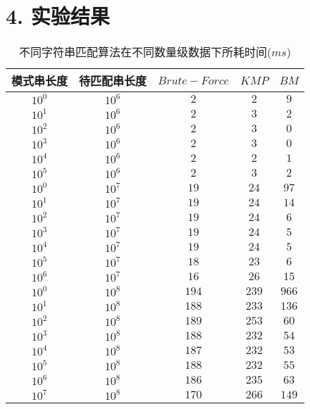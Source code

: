 \documentclass{article}
\begin{document}
  \section*{4. 实验结果}
  \begin{table}[h!]
  	\begin{center}
  		\caption{不同字符串匹配算法在不同数量级数据下所耗时间($ms$)}
  		\begin{tabular}{c|c|c|c|c}
  			\toprule
  			\textbf{模式串长度} & \textbf{待匹配串长度} & \textbf{$Brute-Force$} & \textbf{$KMP$} & \textbf{$BM$} \\
  			\midrule
  			$10^0$ & $10^6$ & $2$ & $2$ & $9$ \\
  			$10^1$ & $10^6$ & $2$ & $3$ & $2$ \\
  			$10^2$ & $10^6$ & $2$ & $3$ & $0$ \\
  			$10^3$ & $10^6$ & $2$ & $3$ & $0$ \\
  			$10^4$ & $10^6$ & $2$ & $2$ & $1$ \\
  			$10^5$ & $10^6$ & $2$ & $3$ & $2$ \\
  			\midrule
  			$10^0$ & $10^7$ & $19$ & $24$ & $97$ \\
  			$10^1$ & $10^7$ & $19$ & $24$ & $14$ \\
  			$10^2$ & $10^7$ & $19$ & $24$ & $6$ \\
  			$10^3$ & $10^7$ & $19$ & $24$ & $5$ \\
  			$10^4$ & $10^7$ & $19$ & $24$ & $5$ \\
  			$10^5$ & $10^7$ & $18$ & $23$ & $6$ \\
  			$10^6$ & $10^7$ & $16$ & $26$ & $15$ \\
  			\midrule
  			$10^0$ & $10^8$ & $194$ & $239$ & $966$ \\
  			$10^1$ & $10^8$ & $188$ & $233$ & $136$ \\
  			$10^2$ & $10^8$ & $189$ & $253$ & $60$ \\
  			$10^3$ & $10^8$ & $188$ & $232$ & $54$ \\
  			$10^4$ & $10^8$ & $187$ & $232$ & $53$ \\
  			$10^5$ & $10^8$ & $188$ & $232$ & $55$ \\
  			$10^6$ & $10^8$ & $186$ & $235$ & $63$ \\
  			$10^7$ & $10^8$ & $170$ & $266$ & $149$ \\
  			\bottomrule
  		\end{tabular}
  	\end{center}
  \end{table}
\end{document}
